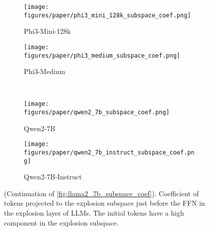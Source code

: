 \begin{figure*}[!t]
    \begin{subfigure}[t]{0.47\textwidth}
        \texttt{[image: figures/paper/phi3\_mini\_128k\_subspace\_coef.png]}
        \caption{Phi3-Mini-128k}\label{fig:phi3_mini_128k_subspace_coef}
    \end{subfigure}
    \begin{subfigure}[t]{0.47\textwidth}
        \texttt{[image: figures/paper/phi3\_medium\_subspace\_coef.png]}
        \caption{Phi3-Medium}\label{fig:phi3_medium_subspace_coef}
    \end{subfigure}\\
    \begin{subfigure}[t]{0.47\textwidth}
        \texttt{[image: figures/paper/qwen2\_7b\_subspace\_coef.png]}
        \caption{Qwen2-7B}\label{fig:qwen2_7b_subspace_coef}
    \end{subfigure}
    \begin{subfigure}[t]{0.47\textwidth}
        \texttt{[image: figures/paper/qwen2\_7b\_instruct\_subspace\_coef.png]}
        \caption{Qwen2-7B-Instruct}\label{fig:qwen2_7b_instruct_subspace_coef}
    \end{subfigure}
    \caption{(Continuation of \cref{fig:llama2_7b_subspace_coef}).
    Coefficient of tokens projected to the explosion subspace just before the FFN in the explosion layer of LLMs.
    The initial tokens have a high component in the explosion subspace.
    }\label{fig:more_llm_subspace_coef}
\end{figure*}
